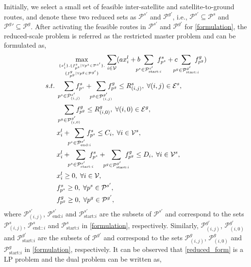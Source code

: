 \documentclass[journal,10pt]{IEEEtran}
\begin{document}
Initially, we select a small set of feasible inter-satellite and satellite-to-ground routes, and denote these two reduced sets as $ \mathcal{P}^{s'}$ and $\mathcal{P}^{g'}$, i.e., $\mathcal{P}^{s'} \subseteq \mathcal{P}^s$ and ${\mathcal{P}^g}' \subseteq \mathcal{P}^g$. After activating the feasible routes in $\mathcal{P}^{s'}$ and $\mathcal{P}^{g'}$ for \eqref{formulation}, the reduced-scale problem is referred as the restricted master problem and can be formulated as,
\begin{subequations}
\label{reduced_form}
\begin{align}
& \max_{\{x^l_i\},\{f^s_{p^s} | \forall p^s \in \mathcal{P}^{s'}\}, \atop \{f^g_{p^g} | \forall p^g \in \mathcal{P}^{g'}\}} \sum_{i \in \mathcal{V}} ( a x^l_i + b \!\!\!\!\! \sum_{p^s \in \mathcal{P}^{s'}_{\text{start:}i}} \!\!\!\!\! f^s_{p^s} + c \!\!\!\!\! \sum_{p^g \in \mathcal{P}^{g'}_{\text{start:}i}} \!\!\!\!\! f^g_{p^g})  \label{reduced_Obj} \\
s.t. \;
& \sum_{p^s \in \mathcal{P}^{s'}_{(i,j)}} \!\!\!\!\! f^s_{p^s} + \!\!\!\sum_{p^g \in \mathcal{P}^{g'}_{(i,j)}} \!\!\!\!\! f^g_{p^g} \leq R^s_{(i,j)}, \; \forall (i,j) \in \mathcal{E}^s, \label{reduced_satcom_con} \\
& \sum_{p^g \in \mathcal{P}^{g'}_{(i,0)}} \!\!\!\!\! f^g_{p^g} \leq R^g_{(i,0)}, \; \forall (i,0) \in \mathcal{E}^g, \label{reduced_groundcom_con} \\
& x^l_i + \!\!\! \sum_{p^s \in \mathcal{P}^{s'}_{\text{end:}i}} \!\!\!\!\! f^s_{p^s} \leq C_i, \; \forall i \in \mathcal{V}^s, \label{reduced_compute_con} \\
& x^l_i + \!\!\! \sum_{p^s \in \mathcal{P}^{s'}_{\text{start:}i}} \!\!\!\!\! f^s_{p^s} + \!\!\! \sum_{p^g \in \mathcal{P}^{g'}_{\text{start:}i}} \!\!\!\!\! f^g_{p^g} \leq D_i, \; \forall i \in \mathcal{V}^s, \label{reduced_data_con} \\
&  x^l_i \geq 0, \; \forall i \in \mathcal{V}, \\
&  f^s_{p^s} \geq 0, \; \forall p^s \in \mathcal{P}^{s'}, \\
&  f^g_{p^g} \geq 0, \; \forall p^g \in \mathcal{P}^{g'}, 
\end{align}
\end{subequations}where $\mathcal{P}^{s'}_{(i,j)}$,  $\mathcal{P}^{s'}_{\text{end:}i}$ and $\mathcal{P}^{s'}_{\text{start:}i}$ are the subsets of $\mathcal{P}^{s'}$ and correspond to the sets $\mathcal{P}^{s}_{(i,j)}$,  $\mathcal{P}^{s}_{\text{end:}:i}$ and $\mathcal{P}^{s}_{\text{start:}i}$ in \eqref{formulation}, respectively. Similarly, $\mathcal{P}^{g'}_{(i,j)}$, $\mathcal{P}^{g'}_{(i,0)}$ and $\mathcal{P}^{g'}_{\text{start:}i}$ are the subsets of $\mathcal{P}^{g'}$ and correspond to the sets $\mathcal{P}^{g}_{(i,j)}$, $\mathcal{P}^{g}_{(i,0)}$ and $\mathcal{P}^{g}_{\text{start:}i}$ in \eqref{formulation}, respectively. It can be observed that \eqref{reduced_form} is a LP problem and the dual problem can be written as,
\end{document}
